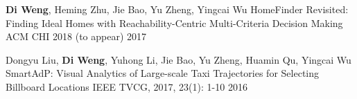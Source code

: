 

\begin{cventries}

  \cventry
    {\textbf{Di Weng}, Heming Zhu, Jie Bao, Yu Zheng, Yingcai Wu} %
    {{\scriptsize HomeFinder Revisited: Finding Ideal Homes with Reachability-Centric Multi-Criteria Decision Making}} %
    {ACM CHI 2018 (to appear)} %
    {2017} %
    {}
  \vspace{-4mm}

  \cventry
    {Dongyu Liu, \textbf{Di Weng}, Yuhong Li, Jie Bao, Yu Zheng, Huamin Qu, Yingcai Wu}
    {\scriptsize SmartAdP: Visual Analytics of Large-scale Taxi Trajectories for Selecting Billboard Locations}
    {IEEE TVCG, 2017, 23(1): 1-10}
    {2016}
    {}

\end{cventries}
\vspace{-5mm}
